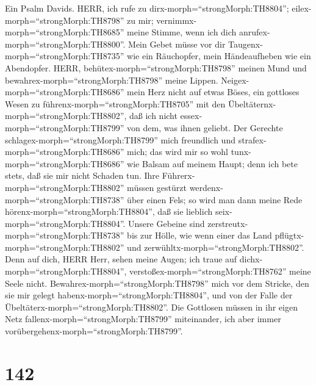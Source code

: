  Ein Psalm Davids. HERR, ich rufe zu
dirx-morph=``strongMorph:TH8804''; eilex-morph=``strongMorph:TH8798'' zu
mir; vernimmx-morph=``strongMorph:TH8685'' meine Stimme, wenn ich dich
anrufex-morph=``strongMorph:TH8800''.  Mein Gebet müsse vor
dir Taugenx-morph=``strongMorph:TH8735'' wie ein Räuchopfer, mein
Händeaufheben wie ein Abendopfer.  HERR,
behütex-morph=``strongMorph:TH8798'' meinen Mund und
bewahrex-morph=``strongMorph:TH8798'' meine Lippen. 
Neigex-morph=``strongMorph:TH8686'' mein Herz nicht auf etwas Böses, ein
gottloses Wesen zu führenx-morph=``strongMorph:TH8705'' mit den
Übeltäternx-morph=``strongMorph:TH8802'', daß ich nicht
essex-morph=``strongMorph:TH8799'' von dem, was ihnen geliebt.
 Der Gerechte schlagex-morph=``strongMorph:TH8799'' mich
freundlich und strafex-morph=``strongMorph:TH8686'' mich; das wird mir
so wohl tunx-morph=``strongMorph:TH8686'' wie Balsam auf meinem Haupt;
denn ich bete stets, daß sie mir nicht Schaden tun.  Ihre
Führerx-morph=``strongMorph:TH8802'' müssen gestürzt
werdenx-morph=``strongMorph:TH8738'' über einen Fels; so wird man dann
meine Rede hörenx-morph=``strongMorph:TH8804'', daß sie lieblich
seix-morph=``strongMorph:TH8804''.  Unsere Gebeine sind
zerstreutx-morph=``strongMorph:TH8738'' bis zur Hölle, wie wenn einer
das Land pflügtx-morph=``strongMorph:TH8802'' und
zerwühltx-morph=``strongMorph:TH8802''.  Denn auf dich, HERR
Herr, sehen meine Augen; ich traue auf
dichx-morph=``strongMorph:TH8804'',
verstoßex-morph=``strongMorph:TH8762'' meine Seele nicht. 
Bewahrex-morph=``strongMorph:TH8798'' mich vor dem Stricke, den sie mir
gelegt habenx-morph=``strongMorph:TH8804'', und von der Falle der
Übeltäterx-morph=``strongMorph:TH8802''.  Die Gottlosen
müssen in ihr eigen Netz fallenx-morph=``strongMorph:TH8799''
miteinander, ich aber immer vorübergehenx-morph=``strongMorph:TH8799''.

\hypertarget{section-141}{%
\section{142}\label{section-141}}

